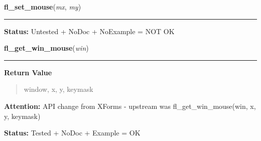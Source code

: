     \label{xformslib:library:fl_set_mouse}

    \vspace{0.5ex}

\hspace{.8\funcindent}\begin{boxedminipage}{\funcwidth}

    \raggedright \textbf{fl\_set\_mouse}(\textit{mx}, \textit{my})

    \vspace{-1.5ex}

    \rule{\textwidth}{0.5\fboxrule}
\setlength{\parskip}{2ex}
\setlength{\parskip}{1ex}
\textbf{Status:} Untested + NoDoc + NoExample = NOT OK



    \end{boxedminipage}

    \label{xformslib:library:fl_get_win_mouse}

    \vspace{0.5ex}

\hspace{.8\funcindent}\begin{boxedminipage}{\funcwidth}

    \raggedright \textbf{fl\_get\_win\_mouse}(\textit{win})

    \vspace{-1.5ex}

    \rule{\textwidth}{0.5\fboxrule}
\setlength{\parskip}{2ex}
\setlength{\parskip}{1ex}
      \textbf{Return Value}
    \vspace{-1ex}

      \begin{quote}
      window, x, y, keymask

      \end{quote}

\textbf{Attention:} API change from XForms - upstream was fl\_get\_win\_mouse(win, x, y, 
keymask)



\textbf{Status:} Tested + NoDoc + Example = OK



    \end{boxedminipage}

    \label{xformslib:library:fl_get_form_mouse}

